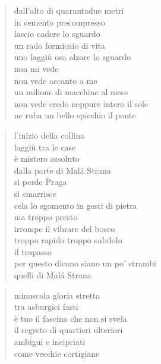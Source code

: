 \begin{verse}
    dall'alto di quarantadue metri\\
    in cemento precompresso\\
    lascio cadere lo sguardo\\
    un rado formicaio di vita\\
    uno laggiù osa alzare lo sguardo\\
    non mi vede\\
    non vede accanto a me\\
    un milione di macchine al mese\\
    non vede credo neppure intero il sole\\
    ne ruba un bello spicchio il ponte
\end{verse}

\clearpage


\begin{verse}
    l'inizio della collina\\
    laggiù tra le case\\
    è mistero assoluto\\
    dalla parte di Malá Strana\\
    si perde Praga\\
    si smarrisce\\
    cela lo sgomento in gesti di pietra\\
    ma troppo presto\\
    irrompe il vibrare del bosco\\
    troppo rapido troppo subdolo\\
    il trapasso\\
    per questo dicono siano un po' strambi\\
    quelli di Malá Strana
\end{verse}

\clearpage


\begin{verse}
    minuscola gloria stretta\\
    tra asburgici fasti\\
    è tuo il fascino che non si svela\\
    il segreto di quartieri ulteriori\\
    ambigui e incipriati\\
    come vecchie cortigiane
\end{verse}

